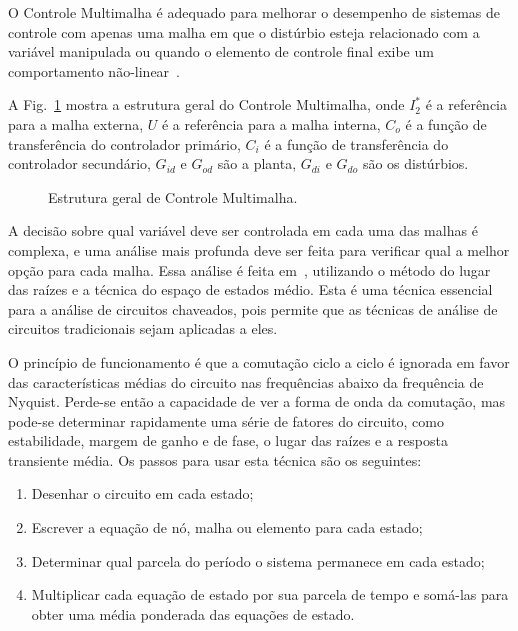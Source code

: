 
    O Controle Multimalha é adequado para melhorar o desempenho de sistemas de controle com apenas uma malha em que o distúrbio esteja relacionado com a variável manipulada ou quando o elemento de controle final exibe um comportamento não-linear~\cite{ref:LEE}.

    A Fig.~\ref{fig:multiloop} mostra a estrutura geral do Controle Multimalha, onde $I_2^*$ é a referência para a malha externa, $U$ é a referência para a malha interna, $C_o$ é a função de transferência do controlador primário, $C_i$ é a função de transferência do controlador secundário, $G_{id}$ e $G_{od}$ são a planta, $G_{di}$ e $G_{do}$ são os distúrbios.


    \begin{figure}[htb]
        \renewcommand\figurename{Fig.}
        \caption{Estrutura geral de Controle Multimalha.}
        \label{fig:multiloop}
    \end{figure}

    A decisão sobre qual variável deve ser controlada em cada uma das malhas é complexa, e uma análise mais profunda deve ser feita para verificar qual a melhor opção para cada malha. Essa análise é feita em~\cite{ref:NASER}, utilizando o método do lugar das raízes e a técnica do espaço de estados médio. Esta é uma técnica essencial para a análise de circuitos chaveados, pois permite que as técnicas de análise de circuitos tradicionais sejam aplicadas a eles.

    O princípio de funcionamento é que a comutação ciclo a ciclo é ignorada em favor das características médias do circuito nas frequências abaixo da frequência de Nyquist. Perde-se então a capacidade de ver a forma de onda da comutação, mas pode-se determinar rapidamente uma série de fatores do circuito, como estabilidade, margem de ganho e de fase, o lugar das raízes e a resposta transiente média. Os passos para usar esta técnica são
    os seguintes:

    \begin{enumerate}
        \item Desenhar o circuito em cada estado;
        \item Escrever a equação de nó, malha ou elemento para cada estado;
        \item Determinar qual parcela do período o sistema permanece em cada estado;
        \item Multiplicar cada equação de estado por sua parcela de tempo e somá-las para obter uma média ponderada das equações de estado.
    \end{enumerate}

